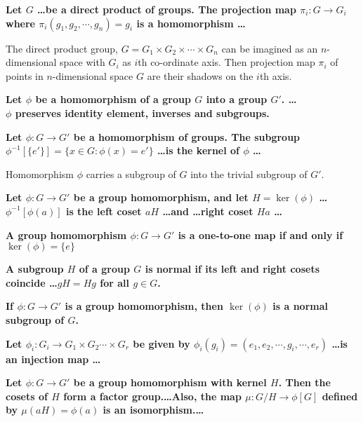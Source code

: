 \documentclass[a4paper,12pt,openany]{book}
\begin{document}
\textbf{\phantom{}}
\textbf{Let $G$ \dots be a direct product of groups. The projection map $\pi_i: G \to G_i$ where $\pi_i(g_1,g_2,\cdots,g_n) = g_i$ is a homomorphism \dots}\\
\begin{story}
	The direct product group, $G = G_1 \times G_2 \times \cdots \times G_n$ can be imagined as an $n$-dimensional space with $G_i$ as $i$th co-ordinate axis.
	Then projection map $\pi_i$ of points in $n$-dimensional space $G$ are their shadows on the $i$th axis.
\end{story}

\textbf{\phantom{}}
\textbf{Let $\phi$ be a homomorphism of a group $G$ into a group $G'$. \dots \\ $\phi$ preserves identity element, inverses and subgroups.}

\textbf{\phantom{}}
\textbf{Let $\phi: G \to G'$ be a homomorphism of groups. The subgroup $\phi^{-1}[\{e'\}] = \{ x \in G : \phi(x) = e'\}$ \dots is the kernel of $\phi$ \dots}\\
\begin{story}
	Homomorphism $\phi$ carries a subgroup of $G$ into the trivial subgroup of $G'$.
\end{story}

\textbf{\phantom{}}
\textbf{Let $\phi : G \to G'$ be a group homomorphism, and let $H = \ker(\phi)$ \dots $\phi^{-1}[\phi(a)]$ is the left coset $aH$ \dots and \dots right coset $Ha$ \dots}

\textbf{\phantom{}}
\textbf{A group homomorphism $\phi : G \to G'$ is a one-to-one map if and only if $\ker(\phi) = \{e\}$}

\textbf{\phantom{}}
\textbf{A subgroup $H$ of a group $G$ is normal if its left and right cosets coincide \dots $gH = Hg$ for all $g \in G$.}

\textbf{\phantom{}}
\textbf{If $\phi : G \to G'$ is a group homomorphism, then $\ker(\phi)$ is a normal subgroup of $G$.}

\textbf{\phantom{}}
\textbf{Let $\phi_i : G_i \to G_1 \times G_2 \cdots \times G_r$ be given by $\phi_i(g_i) = (e_1,e_2,\cdots,g_i,\cdots,e_r)$ \dots is an injection map \dots}

\textbf{\phantom{}}
\textbf{Let $\phi : G \to G'$ be a group homomorphism with kernel $H$. Then the cosets of $H$ form a factor group.\dots Also, the map $\mu : G/H \to \phi[G]$ defined by $\mu(aH) = \phi(a)$ is an isomorphism.\dots}
\end{document}
